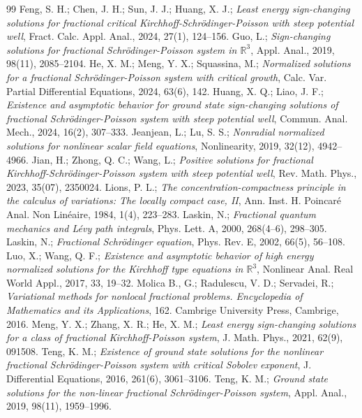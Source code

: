 \documentclass[10pt,a4paper]{amsart}
\numberwithin{equation}{section}
\begin{document}
\begin{thebibliography}{99}
 Feng, S. H.;  Chen, J. H.; Sun, J. J.; Huang, X. J.; \emph{Least energy sign-changing solutions for fractional critical Kirchhoff-Schr\"odinger-Poisson with steep potential well}, Fract. Calc. Appl. Anal., 2024, 27(1), 124--156.
 Guo, L.; \emph{Sign-changing solutions for fractional Schr\"odinger-Poisson system in $\mathbb{R}^3$}, Appl. Anal., 2019, 98(11), 2085--2104.
 He, X. M.; Meng, Y. X.; Squassina, M.; \emph{Normalized solutions for a fractional Schr\"odinger-Poisson system with critical growth}, Calc. Var. Partial Differential Equations, 2024,  63(6), 142.
 Huang, X. Q.; Liao, J. F.; \emph{Existence and asymptotic behavior for ground state sign-changing solutions of fractional Schr\"odinger-Poisson system with steep potential well}, Commun. Anal. Mech., 2024, 16(2), 307--333.
 Jeanjean, L.; Lu, S. S.; \emph{Nonradial normalized solutions for nonlinear scalar field equations}, Nonlinearity, 2019, 32(12), 4942--4966.
 Jian, H.; Zhong, Q. C.; Wang, L.; \emph{Positive solutions for fractional Kirchhoff-Schr\"odinger-Poisson system with steep potential well},  Rev. Math. Phys.,  2023, 35(07), 2350024.
 Lions, P. L.; \emph{The concentration-compactness principle in the calculus of variations: The locally compact case, II}, Ann. Inst. H. Poincar\'e Anal. Non Lin\'eaire, 1984,  1(4), 223--283.
 Laskin, N.; \emph{Fractional quantum mechanics and L\'evy path integrals}, Phys. Lett. A, 2000,  268(4--6), 298--305.
 Laskin, N.; \emph{Fractional Schr\"odinger equation}, Phys. Rev. E, 2002, 66(5), 56--108.
 Luo, X.;  Wang, Q. F.; \emph{Existence and asymptotic behavior of high energy normalized solutions for the Kirchhoff type equations in $\mathbb{R}^3$}, Nonlinear Anal. Real World Appl., 2017, 33, 19--32.
 Molica B., G.; Radulescu, V. D.; Servadei, R.; \emph{Variational methods for nonlocal fractional problems. Encyclopedia of Mathematics and its Applications}, 162. Cambrige University Press, Cambrige, 2016.
 Meng, Y. X.; Zhang, X. R.; He, X. M.; \emph{Least energy sign-changing solutions for a class of fractional Kirchhoff-Poisson system}, J. Math. Phys., 2021, 62(9), 091508.
 Teng, K. M.; \emph{Existence of ground state solutions for the nonlinear fractional Schr\"odinger-Poisson system with critical Sobolev exponent}, J. Differential Equations, 2016, 261(6),  3061--3106.
 Teng, K. M.; \emph{Ground state solutions for the non-linear fractional Schr\"odinger-Poisson system}, Appl. Anal., 2019, 98(11),  1959--1996.

\end{thebibliography}
\end{document}
